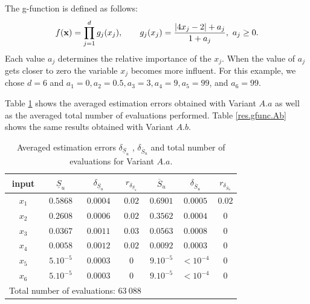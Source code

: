 The g-function is defined as follows:
\begin{equation*}
f(\boldsymbol{\mathbf{x}})= \prod \limits_{j=1}^{d}g_j(x_j), \qquad g_j(x_j)=\frac{\left |4x_j-2 \right | + a_j}{1 + a_j}, \ a_j \geq 0.
\end{equation*}
Each value $a_j$ determines the relative importance of the $x_j$. When the value of $a_j$ gets closer to zero the variable $x_j$ becomes more influent. For this example, we chose $d=6$ and $a_1=0,a_2=0.5, a_3=3, a_4=9, a_5=99$, and $a_6=99$.

Table \ref{res.gfunc.Aa} shows the averaged estimation errors obtained with Variant $A.a$ as well as the averaged total number of evaluations performed. Table \ref{res.gfunc.Ab} shows the same results obtained with Variant $A.b$.
\renewcommand{\arraystretch}{1.25}
\begin{table}[!ht]
\caption{Averaged estimation errors $\delta_{\underline{S}_u}$ , $\delta_{\overline{S}_u}$ and total number of evaluations for Variant $A.a$.}
\centering
\begin{tabular}{ccccccc}
\hline
 input & $\underline{S}_u$ & $\delta_{\underline{S}_u}$ & $r_{\delta_{\underline{S}_u}}$ & $\overline{S}_u$ & $\delta_{\overline{S}_u}$ &$r_{\delta_{\overline{S}_u}}$ \\ \hline
 $x_1$ & $0.5868$ &  $0.0004$ & $0.02$ & $0.6901$ & $0.0005$ & $0.02$ \\ \hline
 $x_2$ & $0.2608$ &  $0.0006$ & $0.02$ & $0.3562$ & $0.0004$ & $0$ \\ \hline
 $x_3$ & $0.0367$ &  $0.0011$ & $0.03$ & $0.0563$ & $0.0008$ & $0$ \\ \hline
 $x_4$ & $0.0058$ &  $0.0012$ & $0.02$ & $0.0092$ & $0.0003$ & $0$ \\ \hline
 $x_5$ & $5.10^{-5}$ & $0.0003$ & $0$ & $9.10^{-5}$ & $< 10^{-4}$ & $0$ \\ \hline
 $x_6$ & $5.10^{-5}$ & $0.0003$ & $0$  & $9.10^{-5}$ & $< 10^{-4}$ & $0$ \\ \hline \hline
\multicolumn{4}{l}{Total number of evaluations: $63 \ 088$} & & &\\ \hline 
\end{tabular}
\label{res.gfunc.Aa}
\end{table}
